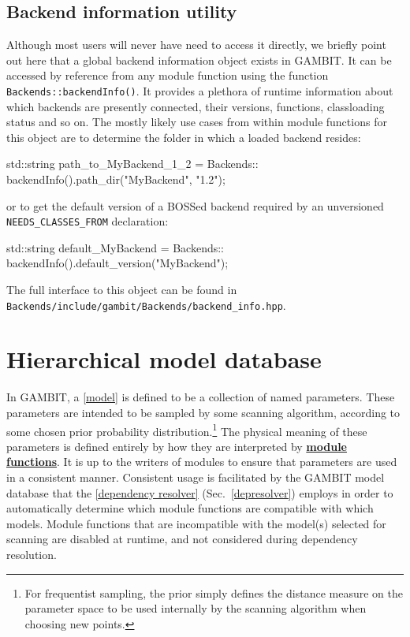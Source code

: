 \documentclass[pdftex,twocolumn,epjc3_preprint,runningheads]{svjour3}
\renewcommand{\_}{\discretionary{\underscore}{}{\underscore}}
\newcommand\cpp[1]{{\lstinline!#1!}}  %
\newcommand\term[1]{{\lstset{style=terminal}\lstinline!#1!\lstset{style=cpp}}}
\newcommand{\cross}[1]{\ref{#1}}
\newcommand{\doublecross}[2]{\hyperref[#2]{\textbf{#1}}}
\newcommand{\gambit}{\textsf{GAMBIT}\xspace}
\newcommand{\GB}{\gambit}
\begin{document}
\subsection{Backend information utility}
\label{backendinfo}

Although most users will never have need to access it directly, we briefly point out here that a global backend information object exists in \GB.  It can be accessed by reference from any module function using the function \cpp{Backends::backendInfo()}.  It provides a plethora of runtime information about which backends are presently connected, their versions, functions, classloading status and so on.  The mostly likely use cases from within module functions for this object are to determine the folder in which a loaded backend resides:
\begin{lstcpp}
std::string path_to_MyBackend_1_2 = Backends::
 backendInfo().path_dir("MyBackend", "1.2");
\end{lstcpp}
or to get the default version of a BOSSed backend required by an unversioned \cpp{NEEDS_CLASSES_FROM} declaration:
\begin{lstcpp}
std::string default_MyBackend = Backends::
 backendInfo().default_version("MyBackend");
\end{lstcpp}
The full interface to this object can be found in \term{Backends/}\term{include/gambit/}\term{Backends/}\term{backend_info.hpp}.


\section{Hierarchical model database}
\label{models}
%
In \GB, a \cross{model} is defined to be a collection of named parameters.  These parameters are intended to be sampled by some scanning algorithm, according to some chosen prior probability distribution.\footnote{For frequentist sampling, the prior simply defines the distance measure on the parameter space to be used internally by the scanning algorithm when choosing new points.} The physical meaning of these parameters is defined entirely by how they are interpreted by \doublecross{module functions}{module function}. It is up to the writers of modules to ensure that parameters are used in a consistent manner. Consistent usage is facilitated by the \GB model database that the \cross{dependency resolver} (Sec.\ \ref{depresolver}) employs in order to automatically determine which module functions are compatible with which models. Module functions that are incompatible with the model(s) selected for scanning are disabled at runtime, and not considered during dependency resolution.
%
\end{document}
